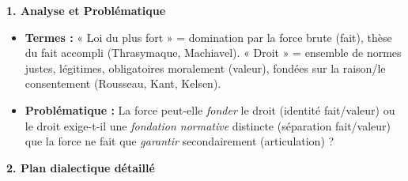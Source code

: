\documentclass[11pt]{article}
\begin{document}
\begin{corrige}
\textbf{1. Analyse et Problématique}
\begin{itemize}
    \item \textbf{Termes :} « Loi du plus fort » = domination par la force brute (fait), thèse du fait accompli (Thrasymaque, Machiavel). « Droit » = ensemble de normes justes, légitimes, obligatoires moralement (valeur), fondées sur la raison/le consentement (Rousseau, Kant, Kelsen).
    \item \textbf{Problématique :} La force peut-elle \emph{fonder} le droit (identité fait/valeur) ou le droit exige-t-il une \emph{fondation normative} distincte (séparation fait/valeur) que la force ne fait que \emph{garantir} secondairement (articulation) ?
\end{itemize}

\textbf{2. Plan dialectique détaillé}


\end{corrige}
\end{document}
